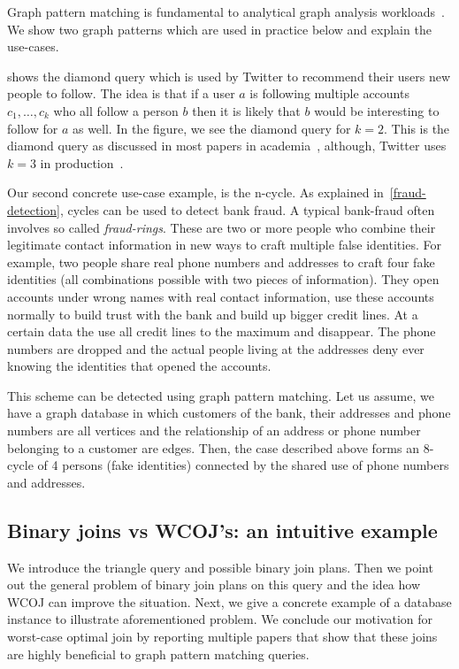Graph pattern matching is fundamental to analytical graph analysis workloads~\cite{see longbin and semih and presentation}.
We show two graph patterns which are used in practice below and explain the use-cases.

 shows the diamond query which is used by Twitter to recommend their users new people to follow.
The idea is that if a user $a$ is following multiple accounts $c_1, \dots, c_k$ who all follow a person $b$ then it is likely that
$b$ would be interesting to follow for $a$ as well.
In the figure, we see the diamond query for $k = 2$.
This is the diamond query as discussed in most papers in academia~\cite{oldog,myria-detailed,mhedhbi2019}, although,
Twitter uses $k = 3$ in production~\cite{twitter-diamond}.

Our second concrete use-case example, is the n-cycle.
As explained in~\cref{fraud-detection}, cycles can be used to detect bank fraud.
A typical bank-fraud often involves so called \textit{fraud-rings}.
These are two or more people who combine their legitimate contact information in new ways to craft multiple false identities.
For example, two people share real phone numbers and addresses to craft four fake identities (all combinations possible with two pieces
of information).
They open accounts under wrong names with real contact information, use these accounts normally to build trust with the bank and
build up bigger credit lines.
At a certain data the use all credit lines to the maximum and disappear.
The phone numbers are dropped and the actual people living at the addresses deny ever knowing the identities that opened the accounts.

This scheme can be detected using graph pattern matching.
Let us assume, we have a graph database in which customers of the bank, their addresses and phone numbers are all vertices and the
relationship of an address or phone number belonging to a customer are edges.
Then, the case described above forms an 8-cycle of 4 persons (fake identities) connected by the shared use of phone numbers and
addresses.

\subsection{Binary joins vs \textsc{WCOJ}'s: an intuitive example} \label{subsec:intuitive-example}
We introduce the triangle query and possible binary join plans.
Then we point out the general problem of binary join plans on this query and the idea how \textsc{WCOJ} can improve the situation.
Next, we give a concrete example of a database instance to illustrate aforementioned problem.
We conclude our motivation for worst-case optimal join by reporting multiple papers that show that these joins are highly beneficial
to graph pattern matching queries.

